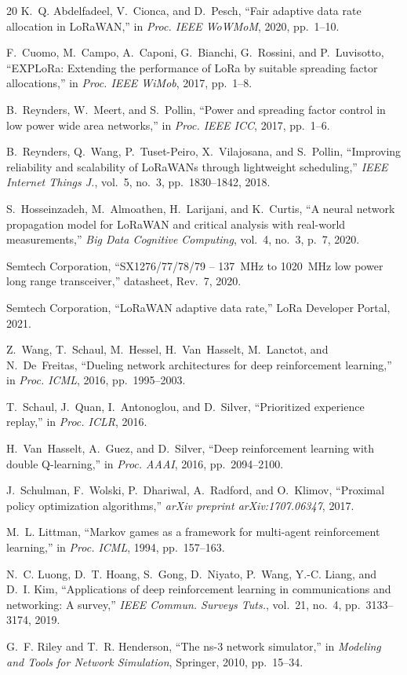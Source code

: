 \documentclass[conference]{IEEEtran}
\begin{document}
\begin{thebibliography}{20}
K.~Q. Abdelfadeel, V.~Cionca, and D.~Pesch, ``Fair adaptive data rate allocation in LoRaWAN,'' in \textit{Proc. IEEE WoWMoM}, 2020, pp.~1--10.

F.~Cuomo, M.~Campo, A.~Caponi, G.~Bianchi, G.~Rossini, and P.~Luvisotto, ``EXPLoRa: Extending the performance of LoRa by suitable spreading factor allocations,'' in \textit{Proc. IEEE WiMob}, 2017, pp.~1--8.

B.~Reynders, W.~Meert, and S.~Pollin, ``Power and spreading factor control in low power wide area networks,'' in \textit{Proc. IEEE ICC}, 2017, pp.~1--6.

B.~Reynders, Q.~Wang, P.~Tuset-Peiro, X.~Vilajosana, and S.~Pollin, ``Improving reliability and scalability of LoRaWANs through lightweight scheduling,'' \textit{IEEE Internet Things J.}, vol.~5, no.~3, pp.~1830--1842, 2018.

S.~Hosseinzadeh, M.~Almoathen, H.~Larijani, and K.~Curtis, ``A neural network propagation model for LoRaWAN and critical analysis with real-world measurements,'' \textit{Big Data Cognitive Computing}, vol.~4, no.~3, p.~7, 2020.

Semtech Corporation, ``SX1276/77/78/79 -- 137~MHz to 1020~MHz low power long range transceiver,'' datasheet, Rev.~7, 2020.

Semtech Corporation, ``LoRaWAN adaptive data rate,'' LoRa Developer Portal, 2021.

Z.~Wang, T.~Schaul, M.~Hessel, H.~Van~Hasselt, M.~Lanctot, and N.~De~Freitas, ``Dueling network architectures for deep reinforcement learning,'' in \textit{Proc. ICML}, 2016, pp.~1995--2003.

T.~Schaul, J.~Quan, I.~Antonoglou, and D.~Silver, ``Prioritized experience replay,'' in \textit{Proc. ICLR}, 2016.

H.~Van~Hasselt, A.~Guez, and D.~Silver, ``Deep reinforcement learning with double Q-learning,'' in \textit{Proc. AAAI}, 2016, pp.~2094--2100.

J.~Schulman, F.~Wolski, P.~Dhariwal, A.~Radford, and O.~Klimov, ``Proximal policy optimization algorithms,'' \textit{arXiv preprint arXiv:1707.06347}, 2017.

M.~L. Littman, ``Markov games as a framework for multi-agent reinforcement learning,'' in \textit{Proc. ICML}, 1994, pp.~157--163.

N.~C. Luong, D.~T. Hoang, S.~Gong, D.~Niyato, P.~Wang, Y.-C. Liang, and D.~I. Kim, ``Applications of deep reinforcement learning in communications and networking: A survey,'' \textit{IEEE Commun. Surveys Tuts.}, vol.~21, no.~4, pp.~3133--3174, 2019.

G.~F. Riley and T.~R. Henderson, ``The ns-3 network simulator,'' in \textit{Modeling and Tools for Network Simulation}, Springer, 2010, pp.~15--34.

\end{thebibliography}
\end{document}
